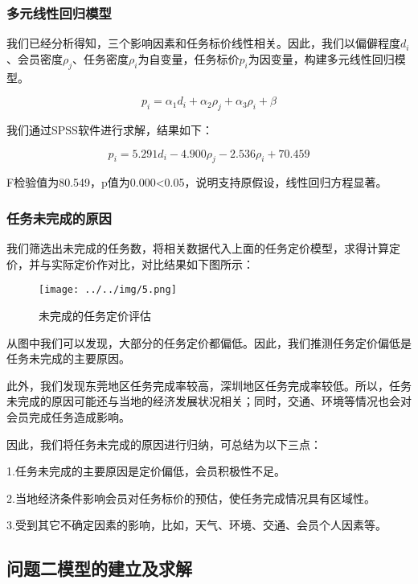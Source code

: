 \documentclass[withoutpreface,bwprint]{cumcmthesis} %
\begin{document}
\subsubsection{多元线性回归模型}
我们已经分析得知，三个影响因素和任务标价线性相关。因此，我们以偏僻程度${d_i}$、会员密度${\rho_j}$、任务密度${\rho_i}$为自变量，任务标价${p_i}$为因变量，构建多元线性回归模型。

\begin{equation}
{p_i} = {\alpha _1}{d_i} + {\alpha _2}{\rho _j} + {\alpha _3}{\rho _i} + \beta 
\end{equation}

我们通过SPSS软件进行求解，结果如下：

\begin{equation}
{p_i} = 5.291{d_i} - 4.900{\rho _j} - 2.536{\rho _i} + 70.459
\end{equation}


F检验值为80.549，p值为0.000<0.05，说明支持原假设，线性回归方程显著。

\subsubsection{任务未完成的原因}

我们筛选出未完成的任务数，将相关数据代入上面的任务定价模型，求得计算定价，并与实际定价作对比，对比结果如下图所示：

\begin{figure}[H]
	\small
	\centering
	\texttt{[image: ../../img/5.png]}
	\caption{未完成的任务定价评估} 
\end{figure}

从图中我们可以发现，大部分的任务定价都偏低。因此，我们推测任务定价偏低是任务未完成的主要原因。

此外，我们发现东莞地区任务完成率较高，深圳地区任务完成率较低。所以，任务未完成的原因可能还与当地的经济发展状况相关；同时，交通、环境等情况也会对会员完成任务造成影响。

因此，我们将任务未完成的原因进行归纳，可总结为以下三点：

1.任务未完成的主要原因是定价偏低，会员积极性不足。

2.当地经济条件影响会员对任务标价的预估，使任务完成情况具有区域性。

3.受到其它不确定因素的影响，比如，天气、环境、交通、会员个人因素等。


\subsection{问题二模型的建立及求解}
\end{document}
